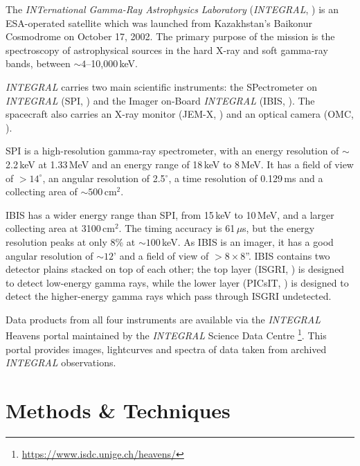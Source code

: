 \par The \textit{INTernational Gamma-Ray Astrophysics Laboratory} (\textit{INTEGRAL}, \citealp{Winkler_INTEGRAL}) is an ESA-operated satellite which was launched from Kazakhstan's Baikonur Cosmodrome on October 17, 2002.  The primary purpose of the mission is the spectroscopy of astrophysical sources in the hard X-ray and soft gamma-ray bands, between $\sim4$--10,000\,keV.
\par \textit{INTEGRAL} carries two main scientific instruments: the SPectrometer on \textit{INTEGRAL} (SPI, \citealp{Vedrenne_SPI}) and the Imager on-Board \textit{INTEGRAL} (IBIS, \citealp{Winkler_IBIS}).  The spacecraft also carries an X-ray monitor (JEM-X, \citealp{Schnopper_JEMX}) and an optical camera (OMC, \citealp{Gimenez_OMC}).
\par SPI is a high-resolution gamma-ray spectrometer, with an energy resolution of $\sim$2.2\,keV at 1.33\,MeV and an energy range of 18\,keV to 8\,MeV.  It has a field of view of $>14^\circ$, an angular resolution of 2.5$^\circ$, a time resolution of 0.129\,ms and a collecting area of $\sim500$\,cm$^2$.
\par IBIS has a wider energy range than SPI, from 15\,keV to 10\,MeV, and a larger collecting area at 3100\,cm$^2$.  The timing accuracy is 61\,$\mu$s, but the energy resolution peaks at only 8\% at $\sim100$\,keV.  As IBIS is an imager, it has a good angular resolution of $\sim12$' and a field of view of $>8\times8$''.  IBIS contains two detector plains stacked on top of each other; the top layer (ISGRI, \citealp{Lebrun_ISGRI}) is designed to detect low-energy gamma rays, while the lower layer (PICsIT, \citealp{Labanti_Picsit}) is designed to detect the higher-energy gamma rays which pass through ISGRI undetected.
\par Data products from all four instruments are available via the \textit{INTEGRAL} Heavens portal \citep{Lubinski_Heavens} maintained by the \textit{INTEGRAL} Science Data Centre \footnote{\url{https://www.isdc.unige.ch/heavens/}}.  This portal provides images, lightcurves and spectra of data taken from archived \textit{INTEGRAL} observations.

\section{Methods \& Techniques}

